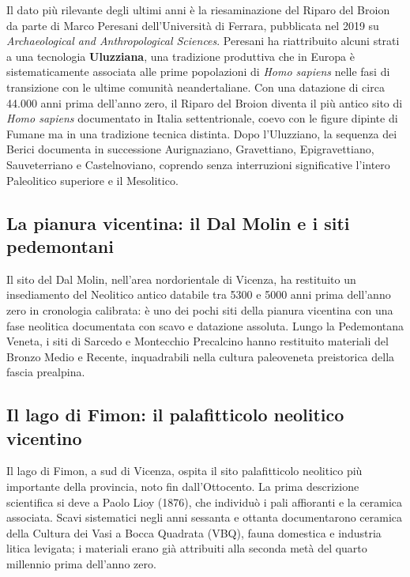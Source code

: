 Il dato più rilevante degli ultimi anni è la riesaminazione del Riparo del Broion da parte di Marco Peresani dell'Università di Ferrara, pubblicata nel 2019 su \emph{Archaeological and Anthropological Sciences}. Peresani ha riattribuito alcuni strati a una tecnologia \textbf{Uluzziana}, una tradizione produttiva che in Europa è sistematicamente associata alle prime popolazioni di \emph{Homo sapiens} nelle fasi di transizione con le ultime comunità neandertaliane. Con una datazione di circa 44.000 anni prima dell'anno zero, il Riparo del Broion diventa il più antico sito di \emph{Homo sapiens} documentato in Italia settentrionale, coevo con le figure dipinte di Fumane ma in una tradizione tecnica distinta. Dopo l'Uluzziano, la sequenza dei Berici documenta in successione Aurignaziano, Gravettiano, Epigravettiano, Sauveterriano e Castelnoviano, coprendo senza interruzioni significative l'intero Paleolitico superiore e il Mesolitico.

\subsection{La pianura vicentina: il Dal Molin e i siti pedemontani}

Il sito del Dal Molin, nell'area nordorientale di Vicenza, ha restituito un insediamento del Neolitico antico databile tra 5300 e 5000 anni prima dell'anno zero in cronologia calibrata: è uno dei pochi siti della pianura vicentina con una fase neolitica documentata con scavo e datazione assoluta. Lungo la Pedemontana Veneta, i siti di Sarcedo e Montecchio Precalcino hanno restituito materiali del Bronzo Medio e Recente, inquadrabili nella cultura paleoveneta preistorica della fascia prealpina.

\subsection{Il lago di Fimon: il palafitticolo neolitico vicentino}

Il lago di Fimon, a sud di Vicenza, ospita il sito palafitticolo neolitico più importante della provincia, noto fin dall'Ottocento. La prima descrizione scientifica si deve a Paolo Lioy (1876), che individuò i pali affioranti e la ceramica associata. Scavi sistematici negli anni sessanta e ottanta documentarono ceramica della Cultura dei Vasi a Bocca Quadrata (VBQ), fauna domestica e industria litica levigata; i materiali erano già attribuiti alla seconda metà del quarto millennio prima dell'anno zero.

